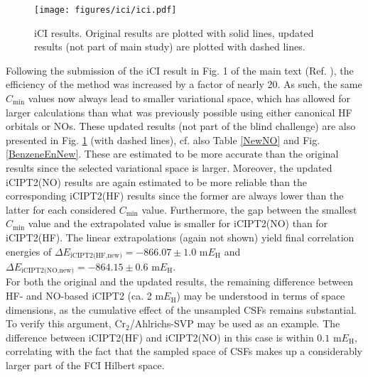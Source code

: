 \documentclass[journal=jcp,manuscript=suppinfo]{achemso}
\begin{document}
%
\begin{figure}[ht!]
\begin{center}
\texttt{[image: figures/ici/ici.pdf]}
\caption{iCI results. Original results are plotted with solid lines, updated results (not part of main study) are plotted with dashed lines.}
\label{ici_SI_fig}
\end{center}
\vspace{-0.6cm}
\end{figure}
%
Following the submission of the iCI result in Fig. 1 of the main text (Ref. ), the efficiency of the method was increased by a factor of nearly 20. As such, the same $C_{\text{min}}$ values now always lead to smaller variational space, which has allowed for larger calculations than what was previously possible using either canonical HF orbitals or NOs. These updated results (not part of the blind challenge) are also presented in Fig. \ref{ici_SI_fig} (with dashed lines), cf. also Table \ref{NewNO} and Fig. \ref{BenzeneEnNew}. These are estimated to be more accurate than the original results since the selected variational space is larger. Moreover, the updated iCIPT2(NO) results are again estimated to be more reliable than the corresponding iCIPT2(HF) results since the former are always lower than the latter for each considered $C_{\text{min}}$ value. Furthermore, the gap between the smallest $C_{\text{min}}$ value and the extrapolated value is smaller for iCIPT2(NO) than for iCIPT2(HF). The linear extrapolations (again not shown) yield final correlation energies of $\Delta E_{\text{iCIPT2(HF,new)}} = -866.07\pm1.0$ m$E_{\text{H}}$ and $\Delta E_{\text{iCIPT2(NO,new)}} = -864.15\pm0.6$ m$E_{\text{H}}$.\\

For both the original and the updated results, the remaining difference between HF- and NO-based iCIPT2 (ca. 2 m$E_{\text{H}}$) may be understood in terms of space dimensions, as the cumulative effect of the unsampled CSFs remains substantial. To verify this argument, Cr$_2$/Ahlrichs-SVP may be used as an example. The difference between iCIPT2(HF) and iCIPT2(NO) in this case is within $0.1$ m$E_{\text{H}}$, correlating with the fact that the sampled space of CSFs makes up a considerably larger part of the FCI Hilbert space.
\end{document}
